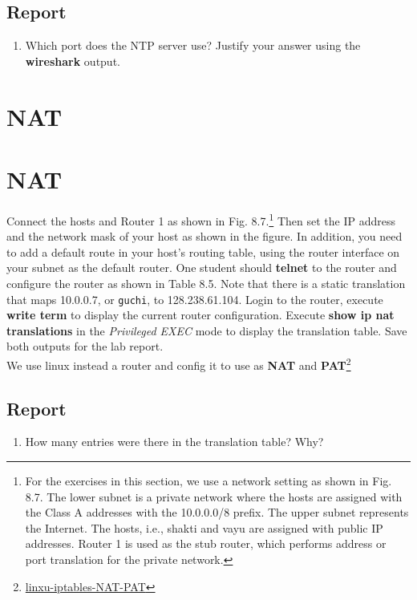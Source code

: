 \documentclass[10pt,a4paper]{article}
\numberwithin{equation}{section}
\numberwithin{figure}{section}
\numberwithin{table}{section}
\begin{document}
    \subsection*{Report}
    \begin{enumerate}
        \item Which port does the NTP server use?
        Justify your answer using the \textbf{wireshark} output.
    \end{enumerate}

    \section*{NAT}
    \section{NAT}
    Connect the hosts and Router 1 as shown in Fig.
    8.7.\footnote{For the exercises in this section, we use a network setting as shown in Fig. 8.7. The lower subnet is a private network where the hosts are assigned with the Class A addresses with the 10.0.0.0/8 prefix. The upper subnet represents the Internet. The hosts, i.e., shakti and vayu are assigned with public IP addresses. Router 1 is used as the stub router, which performs address or port translation for the private network.} Then set the IP address and the network mask of your host as shown in the figure.
    In addition, you need to add a default route in your host’s routing table, using the router interface on your subnet as the default router.
    One student should \textbf{telnet} to the router and configure the router as shown in Table 8.5. Note that there is a static translation that maps 10.0.0.7, or \texttt{guchi}, to 128.238.61.104.
    Login to the router, execute \textbf{write term} to display the current router configuration.
    Execute \textbf{show ip nat translations} in the \textit{Privileged EXEC} mode to display the translation table.
    Save both outputs for the lab report.\\
    We use linux instead a router and config it to use as \textbf{NAT} and \textbf{PAT}\footnote{\href{http://www.solutionsatexperts.com/iptables-nat-pat/}{linxu-iptables-NAT-PAT}}
    \subsection*{Report}
    \begin{enumerate}
        \item How many entries were there in the translation table?
        Why?
    \end{enumerate}
\end{document}
